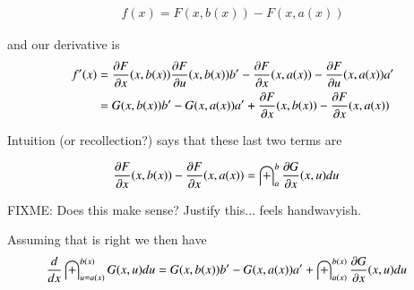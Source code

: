 \documentclass{article}
\begin{document}
\begin{align*}
f(x) = F(x,b(x)) - F(x,a(x))
\end{align*}

and our derivative is
\begin{align*}
f'(x) 
&= 
\PD{x}{F}(x,b(x)) 
\PD{u}{F}(x,b(x)) b'
-\PD{x}{F}(x,a(x)) 
-\PD{u}{F}(x,a(x)) a' \\
&= 
G(x,b(x)) b'
-G(x,a(x)) a'
+\PD{x}{F}(x,b(x)) 
-\PD{x}{F}(x,a(x))  
\\
\end{align*}

Intuition (or recollection?) says that these last two terms are

\begin{align*}
\PD{x}{F}(x,b(x)) 
-\PD{x}{F}(x,a(x))  
&=
\int_{a}^b \PD{x}{G}(x,u) du
\end{align*}

FIXME: Does this make sense?   Justify this... feels handwavyish.

Assuming that is right we then have
\begin{align}\label{eqn:diffInt}
\frac{d}{dx} \int_{u = a(x)}^{b(x)} G(x,u) du  
&= 
G(x,b(x)) b'
-G(x,a(x)) a'
+ \int_{a(x)}^{b(x)} \PD{x}{G}(x,u) du
\end{align}



\end{document}
